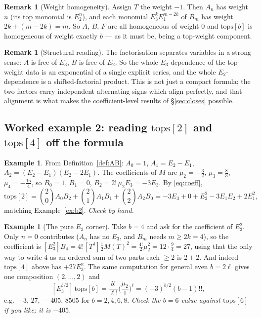 \documentclass[10pt]{article}
\theoremstyle{plain}
\theoremstyle{definition}
\newtheorem{example}[theorem]{Example}
\newtheorem{remark}[theorem]{Remark}
\begin{document}
\begin{remark}[Weight homogeneity]\label{rem:homog}
Assign $T$ the weight $-1$. Then $A_n$ has weight $n$ (its top monomial is $E_2^n$), and each
monomial $E_3^kE_1^{m-2k}$ of $B_m$ has weight $2k+(m-2k)=m$. So $A$, $B$, $F$ are all
homogeneous of weight $0$ and $\mathrm{tops}[b]$ is homogeneous of weight exactly $b$ --- as
it must be, being a top-weight component.
\end{remark}

\begin{remark}[Structural reading]
The factorisation separates variables in a strong sense: $A$ is free of $E_3$, $B$ is free of
$E_2$. So the whole $E_3$-dependence of the top-weight data is an exponential of a single
explicit series, and the whole $E_2$-dependence is a shifted-factorial product. This is not
just a compact formula; the two factors carry independent alternating signs which align
perfectly, and that alignment is what makes the coefficient-level results of
\S\ref{sec:closes} possible.
\end{remark}

\subsection{Worked example 2: reading $\mathrm{tops}[2]$ and $\mathrm{tops}[4]$ off the formula}

\begin{example}\label{ex:check2}
From Definition~\ref{def:AB}: $A_0=1$, $A_1=E_2-E_1$, $A_2=(E_2-E_1)(E_2-2E_1)$. The
coefficients of $M$ are $\mu_2=-\tfrac32$, $\mu_3=\tfrac83$, $\mu_4=-\tfrac{15}4$, so
$B_0=1$, $B_1=0$, $B_2=2!\,\mu_2E_3=-3E_3$. By \eqref{eq:coeff},
\[
 \mathrm{tops}[2]=\binom20A_0B_2+\binom21A_1B_1+\binom22A_2B_0
  =-3E_3+0+E_2^2-3E_1E_2+2E_1^2,
\]
matching Example~\ref{ex:b2}. \emph{Check by hand.}
\end{example}

\begin{example}[The pure $E_3$ corner]\label{ex:e3corner}
Take $b=4$ and ask for the coefficient of $E_3^2$. Only $n=0$ contributes ($A_n$ has no
$E_3$, and $B_m$ needs $m\ge 2k=4$), so the coefficient is $[E_3^2]B_4=4!\,[T^4]\tfrac12
M(T)^2=\tfrac{4!}2\mu_2^2=12\cdot\tfrac94=27$, using that the only way to write $4$ as an
ordered sum of two parts each $\ge2$ is $2+2$. And indeed $\mathrm{tops}[4]$ above has
$+27E_3^2$. The same computation for general even $b=2\ell$ gives one composition
$(2,\dots,2)$ and
\[
 [E_3^{b/2}]\,\mathrm{tops}[b]=\frac{b!}{\ell!}\Big(\frac{\mu_2}{1}\Big)^{\ell}
 =(-3)^{b/2}(b-1)!!,
\]
e.g.\ $-3,\,27,\,-405,\,8505$ for $b=2,4,6,8$. \emph{Check the $b=6$ value against
$\mathrm{tops}[6]$ if you like; it is $-405$.}
\end{example}
\end{document}
